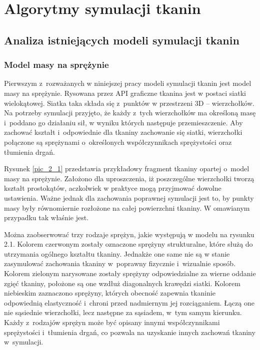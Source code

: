 \chapter{Algorytmy symulacji tkanin}
\label{t:teoria}


	\section{Analiza istniejących modeli symulacji tkanin}
	\label{t:teoria:analiza}
	
		\subsection{Model masy na sprężynie}
		\label{t:teoria:analiza:masa}		
			
			Pierwszym z~rozważanych w niniejszej pracy modeli symulacji tkanin jest model masy na sprężynie. Rysowana przez API graficzne tkanina jest w postaci siatki wielokątowej. Siatka taka składa się z~punktów w przestrzeni 3D -- wierzchołków. Na potrzeby symulacji przyjęto, że każdy z~tych wierzchołków ma określoną masę i~poddano go działaniu sił, w wyniku których następuje przemieszczenie. Aby zachować kształt i~odpowiednie dla tkaniny zachowanie się siatki, wierzchołki połączone są sprężynami o~określonych współczynnikach sprężystości oraz tłumienia drgań. 
			
			
			
			
			Rysunek \ref{pic_2_1} przedstawia przykładowy fragment tkaniny opartej o~model masy na sprężynie. Założono dla uproszczenia, iż poszczególne wierzchołki tworzą kształt prostokątów, aczkolwiek w praktyce mogą przyjmować dowolne ustawienia. Ważne jednak dla zachowania poprawnej symulacji jest to, by punkty masy były równomiernie rozłożone na całej powierzchni tkaniny. W omawianym przypadku tak właśnie jest. 
			
			Można zaobserwować trzy rodzaje sprężyn, jakie występują w modelu na rysunku 2.1. Kolorem czerwonym zostały oznaczone sprężyny strukturalne, które służą do utrzymania ogólnego kształtu tkaniny. Jednakże one same nie są w stanie zasymulować zachowania tkaniny w~poprawny fizycznie i~wizualnie sposób. Kolorem zielonym narysowane zostały sprężyny odpowiedzialne za wierne oddanie zgięć tkaniny, położone są one wzdłuż diagonalnych krawędzi siatki. Kolorem niebieskim zaznaczono sprężyny, których obecność zapewnia tkaninie odpowiednią elastyczność i~chroni przed nadmiernym jej rozciąganiem. Łączą one nie sąsiednie wierzchołki, lecz następne za sąsiadem, w~tym samym kierunku. Każdy z~rodzajów sprężyn może być opisany innymi współczynnikami sprężystości i~tłumienia drgań, co pozwala na uzyskanie innych zachowań tkaniny w~symulacji.
			
